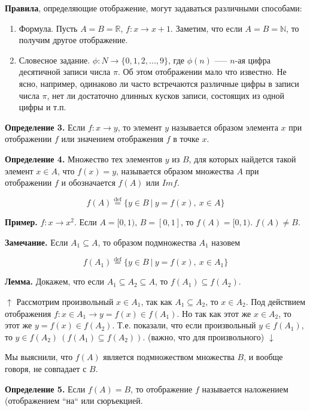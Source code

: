 \documentclass{article}
\begin{document}
    \textbf{Правила}, определяющие отображение, могут задаваться различными способами:

    \begin{enumerate}
        \item Формула. Пусть $A = B = \mathbb{R}$, $f: x \rightarrow x + 1$. Заметим, что если $A = B = \mathbb{N}$, то получим другое отображение.
        \item Словесное задание. $\phi: N \rightarrow \{0,1,2,...,9\}$, где $\phi(n)$ —-- $n$-ая цифра десятичной записи числа $\pi$. Об этом отображении мало что известно. Не ясно, например, одинаково ли часто встречаются различные цифры в записи числа $\pi$, нет ли достаточно длинных кусков записи, состоящих из одной цифры и т.п.
    \end{enumerate}

    \textbf{Определение 3.} Если $f: x \rightarrow y$, то элемент $y$ называется образом элемента $x$ при отображении $f$ или значением отображения $f$ в точке $x$.

    \textbf{Определение 4.} Множество тех элементов $y$ из $B$, для которых найдется такой элемент $x \in A$, что $f(x) = y$, называется образом множества $A$ при отображении $f$ и обозначается $f(A)$ или $Im f$.

    \[f(A) \overset{\mathrm{def}}{=} \{y \in B\ |\ y = f(x),\ x \in A\}\]

    \textbf{Пример.} $f: x \rightarrow x^2$. Если $A = [0, 1)$, $B = [0, 1]$, то $f(A) = [0, 1)$. $f(A) \neq B$.

    \textbf{Замечание.} Если $A_1 \subseteq A$, то образом подмножества $A_1$ назовем

    \[f(A_1) \overset{\mathrm{def}}{=} \{y \in B\ |\ y = f(x),\ x \in A_1\}\]

    \textbf{Лемма.} Докажем, что если $A_1 \subseteq A_2 \subseteq A$, то $f(A_1) \subseteq f(A_2)$.

    $\uparrow$ Рассмотрим произвольный $x \in A_1$, так как $A_1 \subseteq A_2$, то $x \in A_2$. Под действием отображения $f: x \in A_1 \rightarrow y = f(x) \in f(A_1)$. Но так как этот же $x \in A_2$, то этот же $y = f(x) \in f(A_2)$. Т.е. показали, что если произвольный $y \in f(A_1)$, то $y \in f(A_2)\ (f(A_1) \subseteq f(A_2))$. (важно, что для произвольного) $\downarrow$

    Мы выяснили, что $f(A)$ является подмножеством множества $B$, и вообще говоря, не совпадает с $B$.

    \textbf{Определение 5.} Если $f(A) = B$, то отображение $f$ называется наложением (отображением ``на`` или сюръекцией.
\end{document}

